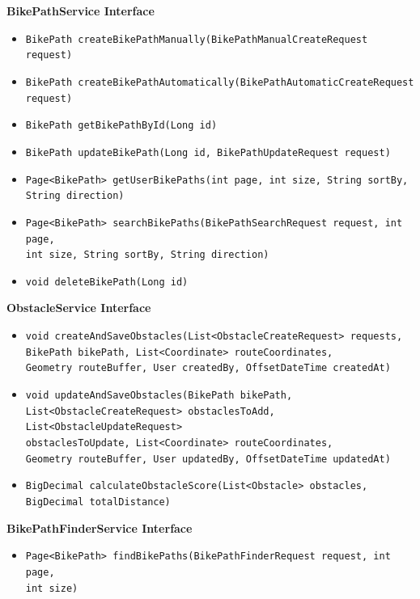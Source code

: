 \textbf{BikePathService Interface}
\begin{itemize}
    \item \texttt{BikePath createBikePathManually(BikePathManualCreateRequest request)}
    \item \texttt{BikePath createBikePathAutomatically(BikePathAutomaticCreateRequest \\ request)}
    \item \texttt{BikePath getBikePathById(Long id)}
    \item \texttt{BikePath updateBikePath(Long id, BikePathUpdateRequest request)}
    \item \texttt{Page<BikePath> getUserBikePaths(int page, int size, String sortBy, \\ String direction)}
    \item \texttt{Page<BikePath> searchBikePaths(BikePathSearchRequest request, int page, \\ int size, String sortBy, String direction)}
    \item \texttt{void deleteBikePath(Long id)}
\end{itemize}

\textbf{ObstacleService Interface}
\begin{itemize}
    \item \texttt{void createAndSaveObstacles(List<ObstacleCreateRequest> requests, \\ BikePath bikePath, List<Coordinate> routeCoordinates, \\ Geometry routeBuffer, User createdBy, OffsetDateTime createdAt)}
    \item \texttt{void updateAndSaveObstacles(BikePath bikePath, \\ List<ObstacleCreateRequest> obstaclesToAdd, List<ObstacleUpdateRequest> \\ obstaclesToUpdate, List<Coordinate> routeCoordinates, \\ Geometry routeBuffer, User updatedBy, OffsetDateTime updatedAt)}
    \item \texttt{BigDecimal calculateObstacleScore(List<Obstacle> obstacles, \\ BigDecimal totalDistance)}
\end{itemize}

\textbf{BikePathFinderService Interface}
\begin{itemize}
    \item \texttt{Page<BikePath> findBikePaths(BikePathFinderRequest request, int page, \\ int size)}
\end{itemize}

